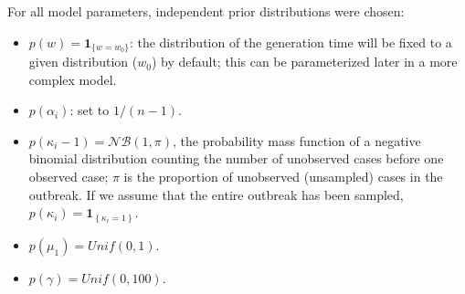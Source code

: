 \documentclass[10pt]{article}
\begin{document}
For all model parameters, independent prior distributions were chosen:
\begin{itemize}
	\item $p(w) = \mathbf{1}_{\{w=w_0\}}$: the distribution of the generation time will be fixed to a given distribution ($w_0$) by default; this can be parameterized later in a more complex model.
	\item $p(\alpha_i)$: set to $1/(n-1)$.
	\item $p(\kappa_i - 1) = \mathcal{NB}(1,\pi)$, the probability mass function of a negative binomial distribution counting the number of unobserved cases before one observed case; $\pi$ is the proportion of unobserved (unsampled) cases in the outbreak. If we assume that the entire outbreak has been sampled, $p(\kappa_i) = \mathbf{1}_{\left\lbrace \kappa_i=1\right\rbrace}$.
	\item $p(\mu_1) = Unif(0,1)$.
	\item $p(\gamma) = Unif(0,100)$. 
\end{itemize}






%   
% 
\end{document}
